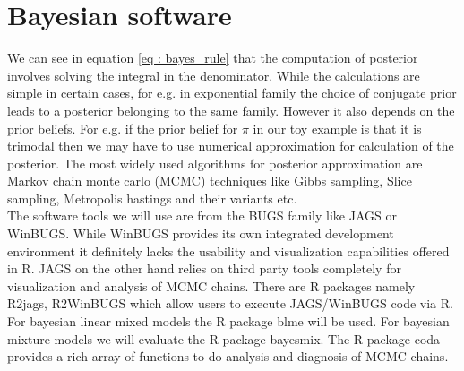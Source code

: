 \section{Bayesian software}
We can see in equation \ref{eq : bayes_rule} that the computation of posterior involves solving the integral in the denominator. While the calculations are simple in certain cases, for e.g. in exponential family the choice of conjugate prior leads to a posterior belonging to the same family. However it also depends on the prior beliefs. For e.g. if the prior belief for $\pi$ in our toy example is that it is trimodal then we may have to use numerical approximation for calculation of the posterior. The most widely used algorithms for posterior approximation are Markov chain monte carlo (MCMC) techniques like Gibbs sampling, Slice sampling, Metropolis hastings and their variants etc.\\

The software tools we will use are from the BUGS family like JAGS or WinBUGS. While WinBUGS provides its own integrated development environment it definitely lacks the usability and visualization capabilities offered in R. JAGS on the other hand relies on third party tools completely for visualization and analysis of MCMC chains. There are R packages namely R2jags, R2WinBUGS which allow users to execute JAGS/WinBUGS code via R. For bayesian linear mixed models the R package blme will be used. For bayesian mixture models we will evaluate the R package bayesmix. The R package coda provides a rich array of functions to do analysis and diagnosis of MCMC chains.\\